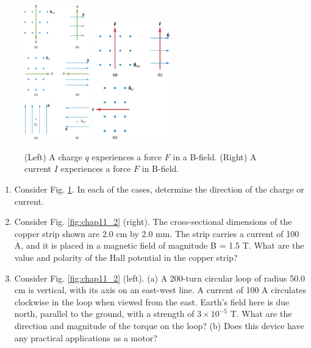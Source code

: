 \documentclass[10pt]{article}
\begin{document}
\begin{figure}
\centering
\includegraphics[width=0.25\textwidth]{lorentzDir.jpeg} \hspace{0.5cm}
\includegraphics[width=0.3\textwidth]{lorentzDirCurrent.jpeg}
\caption{\label{fig:chap11_1} (Left) A charge $q$ experiences a force $F$ in a B-field. (Right) A current $I$ experiences a force $F$ in B-field.}
\end{figure}

\begin{enumerate}
\item Consider Fig. \ref{fig:chap11_1}.  In each of the cases, determine the direction of the charge or current. \\ \vspace{1cm}
\item Consider Fig. \ref{fig:chap11_2} (right). The cross-sectional dimensions of the copper strip shown are 2.0 cm by 2.0 mm. The strip carries a current of 100 A, and it is placed in a magnetic field of magnitude B = 1.5 T. What are the value and polarity of the Hall potential in the copper strip? \\ \vspace{2cm}
\item Consider Fig. \ref{fig:chap11_2} (left). (a) A 200-turn circular loop of radius 50.0 cm is vertical, with its axis on an east-west line. A current of 100 A circulates clockwise in the loop when viewed from the east. Earth’s field here is due north, parallel to the ground, with a strength of $3 \times 10^{-5}$ T.  What are the direction and magnitude of the torque on the loop? (b) Does this device have any practical applications as a motor? \\ \vspace{1cm}
\end{enumerate}
\end{document}
